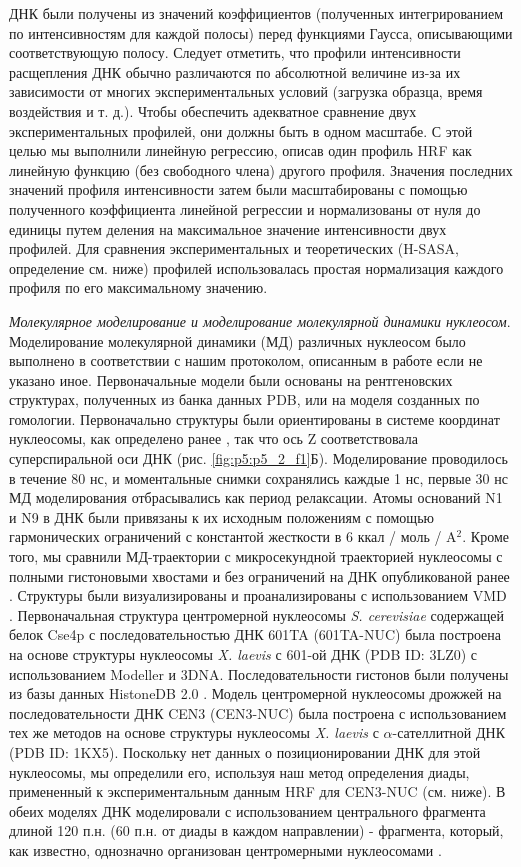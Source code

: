 ДНК были получены из значений коэффициентов (полученных интегрированием по интенсивностям для каждой полосы) перед функциями Гаусса, описывающими соответствующую полосу. Следует отметить, что профили интенсивности расщепления ДНК обычно различаются по абсолютной величине из-за их зависимости от многих экспериментальных условий (загрузка образца, время воздействия и т. д.). Чтобы обеспечить адекватное сравнение двух экспериментальных профилей, они должны быть в одном масштабе. С этой целью мы выполнили линейную регрессию, описав один профиль HRF как линейную функцию (без свободного члена) другого профиля. Значения последних значений профиля интенсивности затем были масштабированы с помощью полученного коэффициента линейной регрессии и нормализованы от нуля до единицы путем деления на максимальное значение интенсивности двух профилей. Для сравнения экспериментальных и теоретических (H-SASA, определение см. ниже) профилей использовалась простая нормализация каждого профиля по его максимальному значению.

\emph{Молекулярное моделирование и моделирование молекулярной динамики нуклеосом}. Моделирование молекулярной динамики (МД) различных нуклеосом было выполнено в соответствии с нашим протоколом, описанным в работе \cite{shaytan_coupling_2016} если не указано иное. Первоначальные модели были основаны на рентгеновских структурах, полученных из банка данных PDB, или на моделя созданных по гомологии. Первоначально структуры были ориентированы в системе координат нуклеосомы, как определено ранее \cite{shaytan_coupling_2016}, так что ось Z соответствовала суперспиральной оси ДНК (рис. \ref{fig:p5:p5_2_f1}Б). Моделирование проводилось в течение 80 нс, и моментальные снимки сохранялись каждые 1 нс, первые 30 нс МД моделирования отбрасывались как период релаксации. Атомы оснований N1 и N9 в ДНК были привязаны к их исходным положениям с помощью гармонических ограничений с константой жесткости в 6 ккал / моль / A$^2$. Кроме того, мы сравнили МД-траектории с микросекундной траекторией нуклеосомы с полными гистоновыми хвостами и без ограничений на ДНК опубликованой ранее \cite{shaytan_trajectories_2016}. Структуры были визуализированы и проанализированы с использованием VMD \cite{humphrey_vmd_1996}. Первоначальная структура центромерной нуклеосомы \textit{S. cerevisiae} содержащей белок Cse4p с последовательностью ДНК 601TA (601TA-NUC) была построена на основе структуры нуклеосомы \textit{X. laevis} с 601-ой ДНК (PDB ID: 3LZ0) с использованием Modeller \cite{sali_comparative_1993} и 3DNA. Последовательности гистонов были получены из базы данных HistoneDB 2.0 \cite{draizen_histonedb_2016}. Модель центромерной нуклеосомы дрожжей на последовательности ДНК CEN3 (CEN3-NUC) была построена с использованием тех же методов на основе структуры нуклеосомы \textit{X. laevis} с $\alpha$-сателлитной  ДНК (PDB ID: 1KX5). Поскольку нет данных о позиционировании ДНК для этой нуклеосомы, мы определили его, используя наш метод определения диады, примененный к экспериментальным данным HRF для CEN3-NUC (см. ниже). В обеих моделях ДНК моделировали с использованием центрального фрагмента длиной 120 п.н. (60 п.н. от диады в каждом направлении) - фрагмента, который, как известно, однозначно организован центромерными нуклеосомами \cite{tachiwana_crystal_2011}. 

